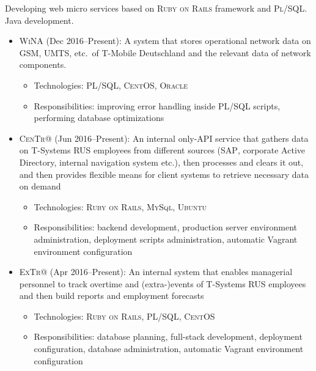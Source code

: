 \documentclass{cv}
\begin{document}
\begin{cvblock}{%
  }

  Developing web micro services based on \textsc{Ruby on Rails} framework and
  \textsc{Pl/SQL}. Java development.

  \begin{itemize}
    \item \textsc{WiNA} (Dec 2016--Present):
      A system that stores operational network data on \textsc{GSM},
      \textsc{UMTS}, etc.\ of T-Mobile Deutschland and the relevant data of
      network components.
      \begin{itemize}
        \item Technologies: \textsc{PL/SQL}, \textsc{CentOS}, \textsc{Oracle}
        \item Responsibilities: improving error handling inside \textsc{PL/SQL}
          scripts, performing database optimizations
      \end{itemize}

    \item \textsc{CenTr@} (Jun 2016--Present):
      An internal only-API service that gathers data on T-Systems RUS employees
      from different sources (\textsc{SAP}, corporate Active Directory,
      internal navigation system etc.), then processes and clears it out, and
      then provides flexible means for client systems to retrieve necessary
      data on demand
      \begin{itemize}
        \item Technologies: \textsc{Ruby on Rails}, \textsc{MySql},
          \textsc{Ubuntu}
        \item Responsibilities: backend development, production server
          environment administration, deployment scripts administration,
          automatic Vagrant environment configuration
      \end{itemize}

    \item \textsc{ExTr@} (Apr 2016--Present):
      An internal system that enables managerial personnel to track overtime
      and (extra-)events of T-Systems RUS employees and then build reports and
      employment forecasts
      \begin{itemize}
        \item Technologies: \textsc{Ruby on Rails}, \textsc{PL/SQL},
          \textsc{CentOS}
        \item Responsibilities: database planning, full-stack development,
          deployment configuration, database administration, automatic Vagrant
          environment configuration
      \end{itemize}


\end{itemize}
\end{cvblock}
\end{document}
